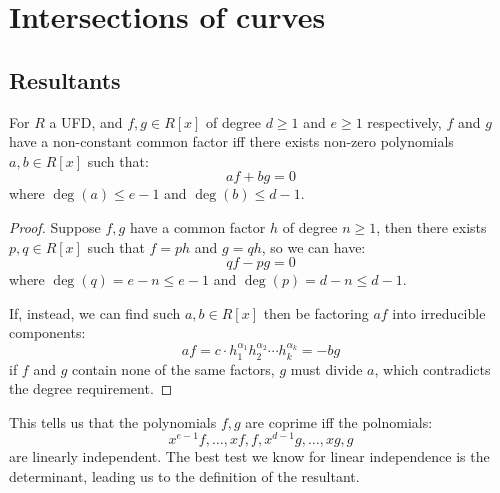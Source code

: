 \documentclass{article}
\begin{document}
\section{Intersections of curves}

\subsection{Resultants}

\begin{lemma}
    For $R$ a UFD, and $f,g\in R[x]$ of degree $d\geq1$ and $e\geq 1$ respectively, $f$ and $g$ have a non-constant common factor iff there exists non-zero polynomials $a,b\in R[x]$ such that: \[
    af + bg = 0
    \] where $\deg(a)\leq e-1$ and $\deg(b)\leq d-1$.
    \begin{proof}
        Suppose $f,g$ have a common factor $h$ of degree $n\geq 1$, then there exists $p,q\in R[x]$ such that $f=ph$ and $g=qh$, so we can have: \[
        qf - pg = 0
        \] where $\deg(q) = e-n \leq e-1$ and $\deg(p) = d-n \leq d-1$.

        If, instead, we can find such $a,b\in R[x]$ then be factoring $af$ into irreducible components: \[
        af = c \cdot h_1^{\alpha_1}h_2^{\alpha_2}\cdots h_k^{\alpha_k} = -bg
        \] if $f$ and $g$ contain none of the same factors, $g$ must divide $a$, which contradicts the degree requirement.
    \end{proof}
\end{lemma}

This tells us that the polynomials $f,g$ are coprime iff the polnomials: \[
    x^{e-1}f, \ldots, xf, f, x^{d-1}g, \ldots, xg, g
\] are linearly independent. The best test we know for linear independence is the determinant, leading us to the definition of the resultant.
\end{document}
